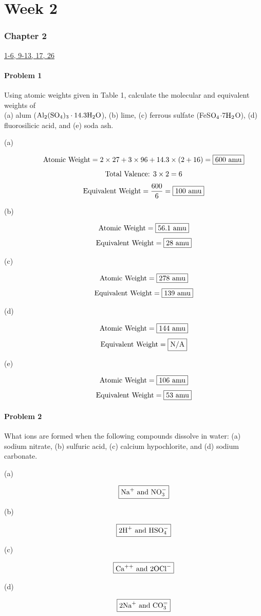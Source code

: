 \part*{Week 2}
\section*{Chapter 2}
\underline{1-6, 9-13, 17, 26}
\subsection*{Problem 1}
Using atomic weights given in Table 1, calculate the molecular and equivalent weights of \\(a) alum
(\(\textnormal{Al}_2(\textnormal{SO}_4)_3\cdot 14.3\textnormal{H}_2\textnormal{O}\)), (b) lime, (c) ferrous sulfate (FeS\(\textnormal{O}_4\)\(\cdot\)7\(\textnormal{H}_2\)O), (d) fluorosilicic acid, and (e) soda ash.\\

\begin{description}
    \item [(a)]\[\textnormal{Atomic Weight} = 2\times 27+3\times 96+14.3\times(2+16)=\boxed{600\textnormal{ amu}}\]
    \[\textnormal{Total Valence: } 3\times 2 = 6\]
    \[\textnormal{Equivalent Weight} = \frac{600}{6}=\boxed{100\textnormal{ amu}}\]
    \item [(b)]
    \[\textnormal{Atomic Weight} =\boxed{56.1\textnormal{ amu}}\]
    \[\textnormal{Equivalent Weight} =\boxed{28\textnormal{ amu}}\]
    \item [(c)]
    \[\textnormal{Atomic Weight} =\boxed{278\textnormal{ amu}}\]
    \[\textnormal{Equivalent Weight} =\boxed{139\textnormal{ amu}}\]
    \item [(d)]
    \[\textnormal{Atomic Weight} =\boxed{144\textnormal{ amu}}\]
    \[\textnormal{Equivalent Weight} =\boxed{\textnormal{N/A}}\]
    \item [(e)]
    \[\textnormal{Atomic Weight} =\boxed{106\textnormal{ amu}}\]
    \[\textnormal{Equivalent Weight} =\boxed{53\textnormal{ amu}}\]
\end{description}
\subsection*{Problem 2}
What ions are formed when the following compounds dissolve in water: (a) sodium nitrate, (b) sulfuric acid, (c) calcium hypochlorite, and (d) sodium carbonate.
\begin{description}
    \item [(a)]
    \[\boxed{\textnormal{Na}^+\textnormal{ and NO}_3^-}\]
    \item [(b)]
    \[\boxed{\textnormal{2H}^+\textnormal{ and HSO}_4^-}\]
    \item [(c)]
    \[\boxed{\textnormal{Ca}^{++}\textnormal{ and 2OCl}^-}\]
    \item [(d)]
    \[\boxed{\textnormal{2Na}^+\textnormal{ and CO}_3^{=}}\]
\end{description}
